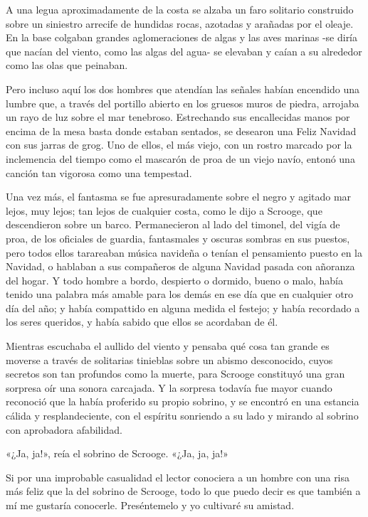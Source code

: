 \documentclass{novela}
\begin{document}
 A una legua aproximadamente de la costa se alzaba un faro solitario construido sobre un siniestro arrecife de hundidas rocas, azotadas y arañadas por el oleaje. En la base colgaban grandes aglomeraciones de algas y las aves marinas -se diría que nacían del viento, como las algas del agua- se elevaban y caían a su alrededor como las olas que peinaban.

 Pero incluso aquí los dos hombres que atendían las señales habían encendido una lumbre que, a través del portillo abierto en los gruesos muros de piedra, arrojaba un rayo de luz sobre el mar tenebroso. Estrechando sus encallecidas manos por encima de la mesa basta donde estaban sentados, se desearon una Feliz Navidad con sus jarras de grog. Uno de ellos, el más viejo, con un rostro marcado por la inclemencia del tiempo como el mascarón de proa de un viejo navío, entonó una canción tan vigorosa como una tempestad.

 Una vez más, el fantasma se fue apresuradamente sobre el negro y agitado mar lejos, muy lejos; tan lejos de cualquier costa, como le dijo a Scrooge, que descendieron sobre un barco. Permanecieron al lado del timonel, del vigía de proa, de los oficiales de guardia, fantasmales y oscuras sombras en sus puestos, pero todos ellos tarareaban música navideña o tenían el pensamiento puesto en la Navidad, o hablaban a sus compañeros de alguna Navidad pasada con añoranza del hogar. Y todo hombre a bordo, despierto o dormido, bueno o malo, había tenido una palabra más amable para los demás en ese día que en cualquier otro día del año; y había compattido en alguna medida el festejo; y había recordado a los seres queridos, y había sabido que ellos se acordaban de él.

 Mientras escuchaba el aullido del viento y pensaba qué cosa tan grande es moverse a través de solitarias tinieblas sobre un abismo desconocido, cuyos secretos son tan profundos como la muerte, para Scrooge constituyó una gran sorpresa oír una sonora carcajada. Y la sorpresa todavía fue mayor cuando reconoció que la había proferido su propio sobrino, y se encontró en una estancia cálida y resplandeciente, con el espíritu sonriendo a su lado y mirando al sobrino con aprobadora afabilidad.

 «¿Ja, ja!», reía el sobrino de Scrooge. «¿Ja, ja, ja!»

 Si por una improbable casualidad el lector conociera a un hombre con una risa más feliz que la del sobrino de Scrooge, todo lo que puedo decir es que también a mí me gustaría conocerle. Preséntemelo y yo cultivaré su amistad.
\end{document}
